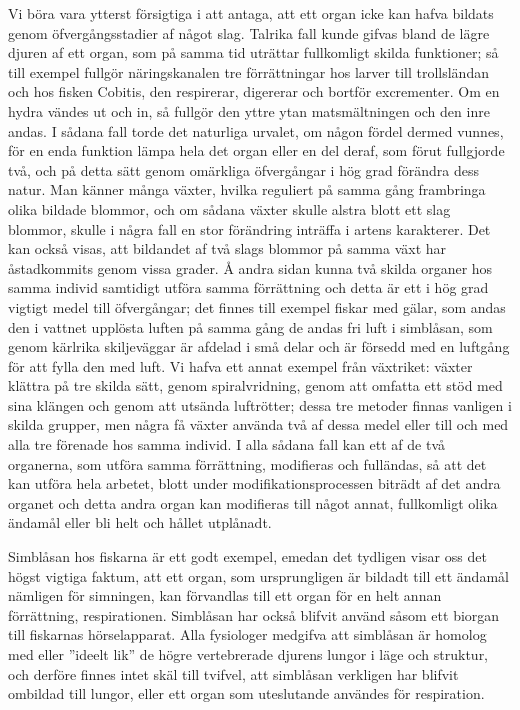 Vi böra vara ytterst försigtiga i att antaga, att ett organ icke kan hafva bildats genom öfvergångsstadier af något slag. Talrika fall kunde gifvas bland de lägre djuren af ett organ, som på samma tid uträttar fullkomligt skilda funktioner; så till exempel fullgör näringskanalen tre förrättningar hos larver till trollsländan och hos fisken Cobitis, den respirerar, digererar och bortför excrementer. Om en hydra vändes ut och in, så fullgör den yttre ytan matsmältningen och den inre andas. I sådana fall torde det naturliga urvalet, om någon fördel dermed vunnes, för en enda funktion lämpa hela det organ eller en del deraf, som förut fullgjorde två, och på detta sätt genom omärkliga öfvergångar i hög grad förändra dess natur. Man känner många växter, hvilka reguliert på samma gång frambringa olika bildade blommor, och om sådana växter skulle alstra blott ett slag blommor, skulle i några fall en stor förändring inträffa i artens karakterer. Det kan också visas, att bildandet af två slags blommor på samma växt har åstadkommits genom vissa grader. Å andra sidan kunna två skilda organer hos samma individ samtidigt utföra samma förrättning och detta är ett i hög grad vigtigt medel till öfvergångar; det finnes till exempel fiskar med gälar, som andas den i vattnet upplösta luften på samma gång de andas fri luft i simblåsan, som genom kärlrika skiljeväggar är afdelad i små delar och är försedd med en luftgång för att fylla den med luft. Vi hafva ett annat exempel från växtriket: växter klättra på tre skilda sätt, genom spiralvridning, genom att omfatta ett stöd med sina klängen och genom att utsända luftrötter; dessa tre metoder finnas vanligen i skilda grupper, men några få växter använda två af dessa medel eller till och med alla tre förenade hos samma individ. I alla sådana fall kan ett af de två organerna, som utföra samma förrättning, modifieras och fulländas, så att det kan utföra hela arbetet, blott under modifikationsprocessen biträdt af det andra organet och detta andra organ kan modifieras till något annat, fullkomligt olika ändamål eller bli helt och hållet utplånadt.

Simblåsan hos fiskarna är ett godt exempel, emedan det tydligen visar oss det högst vigtiga faktum, att ett organ, som ursprungligen är bildadt till ett ändamål nämligen för simningen, kan förvandlas till ett organ för en helt annan förrättning, respirationen. Simblåsan har också blifvit använd såsom ett biorgan till fiskarnas hörselapparat. Alla fysiologer medgifva att simblåsan är homolog med eller ”ideelt lik” de högre vertebrerade djurens lungor i läge och struktur, och derföre finnes intet skäl till tvifvel, att simblåsan verkligen har blifvit ombildad till lungor, eller ett organ som uteslutande användes för respiration.

